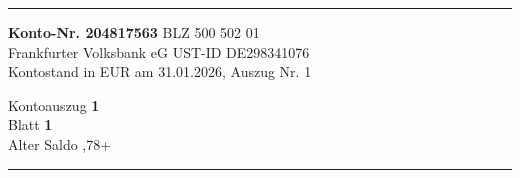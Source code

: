 \documentclass[a4paper,9pt]{article}
\begin{document}
\noindent
{\color{bankred}\rule{\textwidth}{3pt}}

\vspace{0.3cm}

\noindent
\begin{minipage}[t]{0.6\textwidth}
{\small
\textbf{Konto-Nr. 204817563} \quad BLZ 500 502 01 \\
Frankfurter Volksbank eG \quad UST-ID DE298341076\\
Kontostand in EUR am 31.01.2026, Auszug Nr. 1
}
\end{minipage}%
\hfill
\begin{minipage}[t]{0.35\textwidth}
\raggedleft
{\small
Kontoauszug \quad \textbf{1}\\
Blatt \quad \textbf{1}\\
Alter Saldo ,78+
}
\end{minipage}

\vspace{0.3cm}
{\color{bankred}\rule{\textwidth}{0.5pt}}

\vspace{0.4cm}
\end{document}
